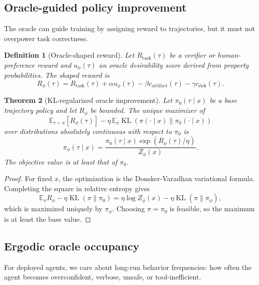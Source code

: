 \documentclass[11pt]{article}
\newtheorem{theorem}{Theorem}[section]
\newtheorem{definition}[theorem]{Definition}
\newcommand{\KL}{\operatorname{KL}}
\numberwithin{equation}{section}
\begin{document}
\subsection{Oracle-guided policy improvement}
The oracle can guide training by assigning reward to trajectories, but it must not overpower task correctness.

\begin{definition}[Oracle-shaped reward]
Let $R_{\mathrm{task}}(\tau)$ be a verifier or human-preference reward and $u_\phi(\tau)$ an oracle desirability score derived from property probabilities. The shaped reward is
\begin{equation}
R_\phi(\tau)=R_{\mathrm{task}}(\tau)+\alpha u_\phi(\tau)-\beta c_{\mathrm{artifact}}(\tau)-\gamma c_{\mathrm{risk}}(\tau).
\end{equation}
\end{definition}

\begin{theorem}[KL-regularized oracle improvement]
Let $\pi_0(\tau\mid x)$ be a base trajectory policy and let $R_\phi$ be bounded. The unique maximizer of
\begin{equation}
\mathbb{E}_{\tau\sim\pi}[R_\phi(\tau)]-\eta\,\mathbb{E}_{x}\KL(\pi(\cdot\mid x)\|\pi_0(\cdot\mid x))
\end{equation}
over distributions absolutely continuous with respect to $\pi_0$ is
\begin{equation}
\pi_\phi(\tau\mid x)=\frac{\pi_0(\tau\mid x)\exp(R_\phi(\tau)/\eta)}{Z_\phi(x)}.
\end{equation}
The objective value is at least that of $\pi_0$.
\end{theorem}
\begin{proof}
For fixed $x$, the optimization is the Donsker-Varadhan variational formula. Completing the square in relative entropy gives
\begin{equation}
\mathbb{E}_\pi R_\phi-\eta\KL(\pi\|\pi_0)=\eta\log Z_\phi(x)-\eta\KL(\pi\|\pi_\phi),
\end{equation}
which is maximized uniquely by $\pi_\phi$. Choosing $\pi=\pi_0$ is feasible, so the maximum is at least the base value.
\end{proof}

\subsection{Ergodic oracle occupancy}
For deployed agents, we care about long-run behavior frequencies: how often the agent becomes overconfident, verbose, unsafe, or tool-inefficient.
\end{document}
